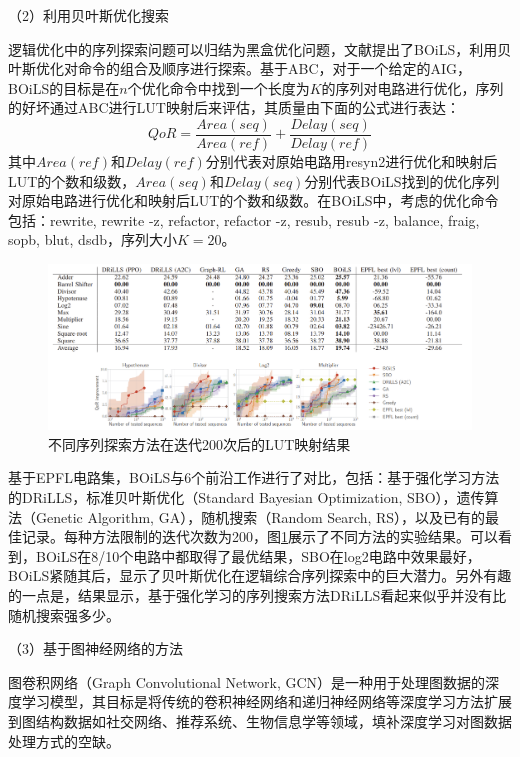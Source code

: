 （2）利用贝叶斯优化搜索

逻辑优化中的序列探索问题可以归结为黑盒优化问题，文献\cite{LS:BOiLS}提出了BOiLS，利用贝叶斯优化对命令的组合及顺序进行探索。基于ABC，对于一个给定的AIG，BOiLS的目标是在$n$个优化命令中找到一个长度为$K$的序列对电路进行优化，序列的好坏通过ABC进行LUT映射后来评估，其质量由下面的公式进行表达：
\begin{equation}
    \label{LS:BOiLS:Eq:QoR}
    QoR = \frac{Area(seq)}{Area(ref)} + \frac{Delay(seq)}{Delay(ref)}
\end{equation}
其中$Area(ref)$和$Delay(ref)$分别代表对原始电路用resyn2进行优化和映射后LUT的个数和级数，$Area(seq)$和$Delay(seq)$分别代表BOiLS找到的优化序列对原始电路进行优化和映射后LUT的个数和级数。在BOiLS中，考虑的优化命令包括：rewrite, rewrite -z, refactor, refactor -z, resub, resub -z, balance, fraig, sopb, blut, dsdb，序列大小$K=20$。

\begin{figure}[!htbp]
    \centering
    \includegraphics[width=\linewidth]{./figs/LS-BOiLS-results.png}
    \caption{不同序列探索方法在迭代200次后的LUT映射结果}
    \label{LS:BOiLS:Fig:results}
\end{figure}

基于EPFL电路集\cite{LS:EPFL_benchs_iwls,LS:EPFL_benchs_github}，BOiLS与6个前沿工作进行了对比，包括：基于强化学习方法的DRiLLS\cite{LS:DRiLLS}，标准贝叶斯优化（Standard Bayesian Optimization, SBO），遗传算法（Genetic Algorithm, GA），随机搜索（Random Search, RS），以及已有的最佳记录。每种方法限制的迭代次数为200，图\ref{LS:BOiLS:Fig:results}展示了不同方法的实验结果。可以看到，BOiLS在8/10个电路中都取得了最优结果，SBO在log2电路中效果最好，BOiLS紧随其后，显示了贝叶斯优化在逻辑综合序列探索中的巨大潜力。另外有趣的一点是，结果显示，基于强化学习的序列搜索方法DRiLLS看起来似乎并没有比随机搜索强多少。

（3）基于图神经网络的方法

图卷积网络（Graph Convolutional Network, GCN）是一种用于处理图数据的深度学习模型，其目标是将传统的卷积神经网络和递归神经网络等深度学习方法扩展到图结构数据如社交网络、推荐系统、生物信息学等领域，填补深度学习对图数据处理方式的空缺。


